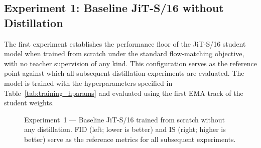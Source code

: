 \subsection{Experiment 1: Baseline JiT-S/16 without Distillation}
\label{subsec:exp1}

The first experiment establishes the performance floor of the JiT-S/16
student model when trained from scratch under the standard flow-matching
objective, with no teacher supervision of any kind. This configuration
serves as the reference point against which all subsequent distillation
experiments are evaluated. The model is trained with the hyperparameters
specified in Table~\ref{tab:training_hparams} and evaluated using the
first EMA track of the student weights.

\begin{figure}[ht]
    \centering
    \begin{subfigure}[b]{0.44\linewidth}
        \centering
    \end{subfigure}
    \hfill
    \begin{subfigure}[b]{0.44\linewidth}
        \centering
    \end{subfigure}
    \caption{Experiment~1 — Baseline JiT-S/16 trained from scratch without
    any distillation. FID (left; lower is better) and IS (right; higher is
    better) serve as the reference metrics for all subsequent experiments.}
    \label{fig:exp1_results}
\end{figure}

